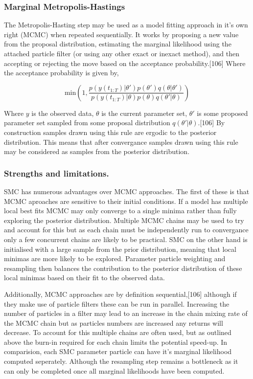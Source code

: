 \documentclass[11pt,twoside]{bristolthesis}
\begin{document}
  \hypertarget{marginal-metropolis-hastings}{%
  \subsubsection{Marginal Metropolis-Hastings}\label{marginal-metropolis-hastings}}
  
  The Metropolis-Hasting step may be used as a model fitting approach in it's own right (MCMC) when repeated sequentially. It works by proposing a new value from the proposal distribution, estimating the marginal likelihood using the attached particle filter (or using any other exact or inexact method), and then accepting or rejecting the move based on the acceptance probability.{[}106{]} Where the acceptance probability is given by,
  
  \[ \text{min} \left(1,  \frac{p(y(t_{1:T}) |\theta')p(\theta')q(\theta | \theta')}{p(y(t_{1:T}) |\theta)p(\theta)q(\theta' | \theta)}\right) \]
  
  Where \(y\) is the observed data, \(\theta\) is the current parameter set, \(\theta'\) is some proposed parameter set sampled from some proposal distribution \(q(\theta' | \theta)\).{[}106{]} By construction samples drawn using this rule are ergodic to the posterior distribution. This means that after convergance samples drawn using this rule may be considered as samples from the posterior distribution.
  
  \hypertarget{strengths-and-limitations.}{%
  \subsubsection{Strengths and limitations.}\label{strengths-and-limitations.}}
  
  SMC has numerous advantages over MCMC approaches. The first of these is that MCMC aproaches are sensitive to their initial conditions. If a model has multiple local best fits MCMC may only converge to a single minima rather than fully exploring the posterior distribution. Multiple MCMC chains may be used to try and account for this but as each chain must be independently run to convergance only a few concurrent chains are likely to be practical. SMC on the other hand is initialised with a large sample from the prior distribution, meaning that local minimas are more likely to be explored. Parameter particle weighting and resampling then balances the contribution to the posterior distribution of these local minimas based on their fit to the observed data.
  
  Additionally, MCMC approaches are by definition sequential,{[}106{]} although if they make use of particle filters these can be run in parallel. Increasing the number of particles in a filter may lead to an increase in the chain mixing rate of the MCMC chain but as particles numbers are increased any returns will decrease. To account for this multiple chains are often used, but as outlined above the burn-in required for each chain limits the potential speed-up. In comparision, each SMC parameter particle can have it's marginal likelihood computed seperately. Although the resampling step remains a bottleneck as it can only be completed once all marginal likelihoods have been computed.
  
\end{document}
